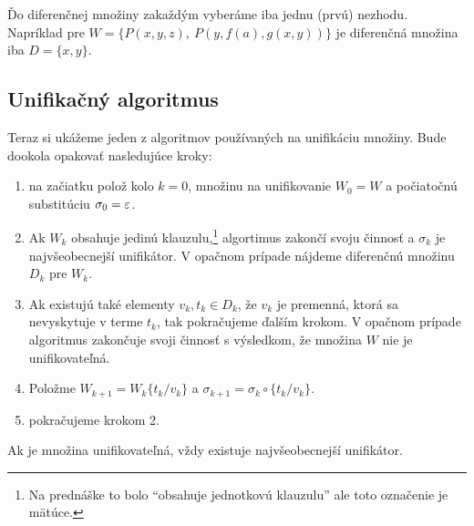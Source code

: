 \begin{poznamka}
    Ďo diferenčnej množiny zakaždým vyberáme iba jednu (prvú) nezhodu.
    Napríklad pre $W=\{P(x,y,z),\ P(y,f(a),g(x,y))\}$ je diferenčná množina
    iba $D=\{x,y\}$.
\end{poznamka}

\subsection{Unifikačný algoritmus}

Teraz si ukážeme jeden z algoritmov používaných na unifikáciu množiny. Bude
dookola opakovať nasledujúce kroky:
\begin{enumerate}
    \item na začiatku polož kolo $k=0$, množinu na unifikovanie 
        $W_0 = W$ a počiatočnú substitúciu  $\sigma_0 = \varepsilon$.

    \item Ak $W_k$ obsahuje jedinú klauzulu,\footnote{Na prednáške
        to bolo ``obsahuje jednotkovú klauzulu'' ale toto označenie je
        mätúce.} algortimus zakončí svoju činnosť
        a $\sigma_k$ je najvšeobecnejší unifikátor.
        V opačnom prípade nájdeme diferenčnú množinu $D_k$ pre $W_k$.

    \item Ak existujú také elementy $v_k,t_k \in D_k$, že $v_k$ je
        premenná, ktorá sa nevyskytuje v terme $t_k$, tak pokračujeme ďalším
        krokom.
        V opačnom prípade algoritmus zakončuje svoji činnosť
        s výsledkom, že množina $W$ nie je unifikovateľná.

    \item Položme $W_{k+1} = W_k \{t_k/v_k\}$ a
        $\sigma_{k+1} = \sigma_k \circ \{t_k/v_k\}$. 

    \item pokračujeme krokom 2.
\end{enumerate}

\begin{poznamka}
    Ak je množina unifikovateľná, vždy existuje najvšeobecnejší unifikátor.
\end{poznamka}


